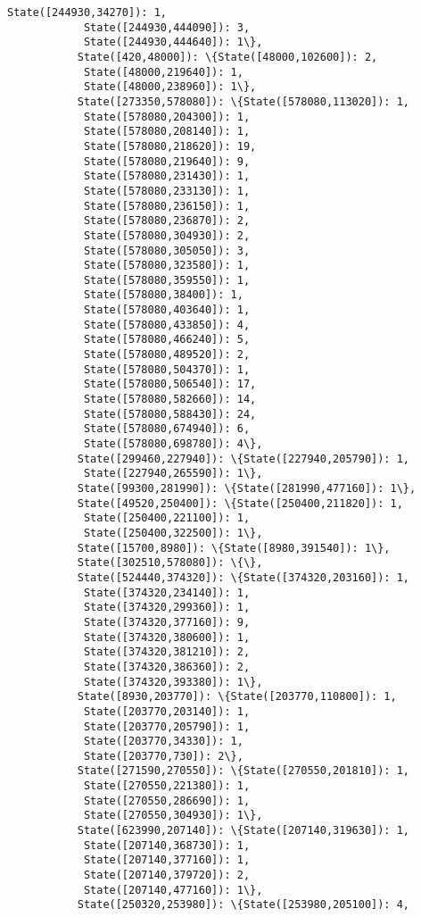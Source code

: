 \documentclass[11pt]{article}
\begin{document}
\begin{Verbatim}[commandchars=\\\{\}]
            State([244930,34270]): 1,
            State([244930,444090]): 3,
            State([244930,444640]): 1\},
           State([420,48000]): \{State([48000,102600]): 2,
            State([48000,219640]): 1,
            State([48000,238960]): 1\},
           State([273350,578080]): \{State([578080,113020]): 1,
            State([578080,204300]): 1,
            State([578080,208140]): 1,
            State([578080,218620]): 19,
            State([578080,219640]): 9,
            State([578080,231430]): 1,
            State([578080,233130]): 1,
            State([578080,236150]): 1,
            State([578080,236870]): 2,
            State([578080,304930]): 2,
            State([578080,305050]): 3,
            State([578080,323580]): 1,
            State([578080,359550]): 1,
            State([578080,38400]): 1,
            State([578080,403640]): 1,
            State([578080,433850]): 4,
            State([578080,466240]): 5,
            State([578080,489520]): 2,
            State([578080,504370]): 1,
            State([578080,506540]): 17,
            State([578080,582660]): 14,
            State([578080,588430]): 24,
            State([578080,674940]): 6,
            State([578080,698780]): 4\},
           State([299460,227940]): \{State([227940,205790]): 1,
            State([227940,265590]): 1\},
           State([99300,281990]): \{State([281990,477160]): 1\},
           State([49520,250400]): \{State([250400,211820]): 1,
            State([250400,221100]): 1,
            State([250400,322500]): 1\},
           State([15700,8980]): \{State([8980,391540]): 1\},
           State([302510,578080]): \{\},
           State([524440,374320]): \{State([374320,203160]): 1,
            State([374320,234140]): 1,
            State([374320,299360]): 1,
            State([374320,377160]): 9,
            State([374320,380600]): 1,
            State([374320,381210]): 2,
            State([374320,386360]): 2,
            State([374320,393380]): 1\},
           State([8930,203770]): \{State([203770,110800]): 1,
            State([203770,203140]): 1,
            State([203770,205790]): 1,
            State([203770,34330]): 1,
            State([203770,730]): 2\},
           State([271590,270550]): \{State([270550,201810]): 1,
            State([270550,221380]): 1,
            State([270550,286690]): 1,
            State([270550,304930]): 1\},
           State([623990,207140]): \{State([207140,319630]): 1,
            State([207140,368730]): 1,
            State([207140,377160]): 1,
            State([207140,379720]): 2,
            State([207140,477160]): 1\},
           State([250320,253980]): \{State([253980,205100]): 4,

\end{Verbatim}
\end{document}

